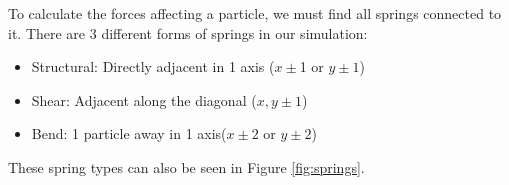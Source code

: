\documentclass[sigconf]{acmart}
\begin{document}
To calculate the forces affecting a particle, we must find all springs connected to it. There are 3 different forms of springs in our simulation:
\begin{itemize}
\item Structural: Directly adjacent in 1 axis ($x\pm$1 or $y\pm1$)
\item Shear: Adjacent along the diagonal ($x,y\pm1$)
\item Bend:  1 particle away in 1 axis($x\pm2$ or $y\pm 2$)
\end{itemize}
These spring types can also be seen in Figure \ref{fig:springs}.
\begin{figure}



\begin{tikzpicture}[x=0.75pt,y=0.75pt,yscale=-1,xscale=1]


\end{tikzpicture}
\end{figure}
\end{document}
